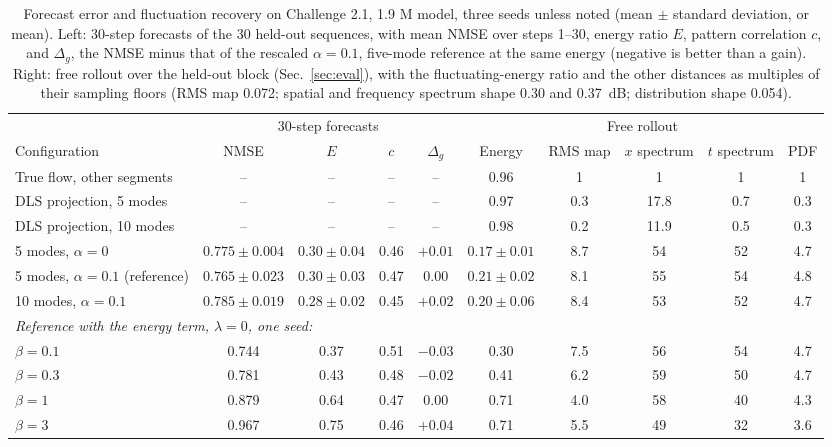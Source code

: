 \documentclass[conf]{new-aiaa}
\begin{document}
\begin{table}[!tbp]
  \centering
  \small
  \setlength{\tabcolsep}{3pt}
  \caption{Forecast error and fluctuation recovery on Challenge 2.1, 1.9 M model, three seeds unless noted (mean $\pm$ standard deviation, or mean). Left: 30-step forecasts of the 30 held-out sequences, with mean NMSE over steps 1--30, energy ratio $E$, pattern correlation $c$, and $\Delta_g$, the NMSE minus that of the rescaled $\alpha=0.1$, five-mode reference at the same energy (negative is better than a gain). Right: free rollout over the held-out block (Sec.~\ref{sec:eval}), with the fluctuating-energy ratio and the other distances as multiples of their sampling floors (RMS map 0.072; spatial and frequency spectrum shape 0.30 and 0.37~dB; distribution shape 0.054).}
  \label{tab:tradeoff}
  \begin{tabular}{lccccccccc}
    \toprule
    & \multicolumn{4}{c}{30-step forecasts} & \multicolumn{5}{c}{Free rollout} \\
    \cmidrule(lr){2-5}\cmidrule(lr){6-10}
    Configuration & NMSE & $E$ & $c$ & $\Delta_g$ & Energy & RMS map & $x$ spectrum & $t$ spectrum & PDF \\
    \midrule
    True flow, other segments & -- & -- & -- & -- & 0.96 & 1 & 1 & 1 & 1 \\
    DLS projection, 5 modes & -- & -- & -- & -- & 0.97 & 0.3 & 17.8 & 0.7 & 0.3 \\
    DLS projection, 10 modes & -- & -- & -- & -- & 0.98 & 0.2 & 11.9 & 0.5 & 0.3 \\
    \midrule
    5 modes, $\alpha=0$ & $0.775\pm0.004$ & $0.30\pm0.04$ & 0.46 & $+0.01$ & $0.17\pm0.01$ & 8.7 & 54 & 52 & 4.7 \\
    5 modes, $\alpha=0.1$ (reference) & $0.765\pm0.023$ & $0.30\pm0.03$ & 0.47 & $0.00$ & $0.21\pm0.02$ & 8.1 & 55 & 54 & 4.8 \\
    10 modes, $\alpha=0.1$ & $0.785\pm0.019$ & $0.28\pm0.02$ & 0.45 & $+0.02$ & $0.20\pm0.06$ & 8.4 & 53 & 52 & 4.7 \\
    \midrule
    \multicolumn{10}{l}{\emph{Reference with the energy term, $\lambda=0$, one seed:}} \\
    \quad $\beta=0.1$ & 0.744 & 0.37 & 0.51 & $-0.03$ & 0.30 & 7.5 & 56 & 54 & 4.7 \\
    \quad $\beta=0.3$ & 0.781 & 0.43 & 0.48 & $-0.02$ & 0.41 & 6.2 & 59 & 50 & 4.7 \\
    \quad $\beta=1$ & 0.879 & 0.64 & 0.47 & $0.00$ & 0.71 & 4.0 & 58 & 40 & 4.3 \\
    \quad $\beta=3$ & 0.967 & 0.75 & 0.46 & $+0.04$ & 0.71 & 5.5 & 49 & 32 & 3.6 \\
    \bottomrule
  \end{tabular}
\end{table}
\end{document}
